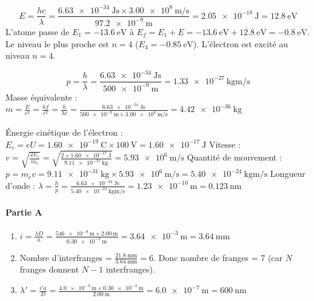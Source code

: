 \[
E = \frac{h c}{\lambda} = \frac{\SI{6.63e-34}{\joule\second} \times \SI{3.00e8}{\metre\per\second}}{\SI{97.2e-9}{\metre}} = \SI{2.05e-18}{\joule} = \SI{12.8}{\electronvolt}
\]
L'atome passe de \(E_1 = \SI{-13.6}{\electronvolt}\) à \(E_f = E_1 + E = \SI{-13.6}{\electronvolt} + \SI{12.8}{\electronvolt} = \SI{-0.8}{\electronvolt}\). Le niveau le plus proche est \(n=4\) (\(E_4 = \SI{-0.85}{\electronvolt}\)). L'électron est excité au niveau \(n=4\).

\[
p = \frac{h}{\lambda} = \frac{\SI{6.63e-34}{\joule\second}}{\SI{500e-9}{\metre}} = \SI{1.33e-27}{\kilogram\metre\per\second}
\]
Masse équivalente : \(m = \frac{E}{c^2} = \frac{h f}{c^2} = \frac{h}{\lambda c} = \frac{\SI{6.63e-34}{\joule\second}}{\SI{500e-9}{\metre} \times \SI{3.00e8}{\metre\per\second}} = \SI{4.42e-36}{\kilogram}\)

Énergie cinétique de l'électron : \(E_c = e U = \SI{1.60e-19}{\coulomb} \times \SI{100}{\volt} = \SI{1.60e-17}{\joule}\)
Vitesse : \(v = \sqrt{\frac{2 E_c}{m_e}} = \sqrt{\frac{2 \times \SI{1.60e-17}{\joule}}{\SI{9.11e-31}{\kilogram}}} = \SI{5.93e6}{\metre\per\second}\)
Quantité de mouvement : \(p = m_e v = \SI{9.11e-31}{\kilogram} \times \SI{5.93e6}{\metre\per\second} = \SI{5.40e-24}{\kilogram\metre\per\second}\)
Longueur d'onde : \(\lambda = \frac{h}{p} = \frac{\SI{6.63e-34}{\joule\second}}{\SI{5.40e-24}{\kilogram\metre\per\second}} = \SI{1.23e-10}{\metre} = \SI{0.123}{\nano\metre}\)

\paragraph{Partie A}
\begin{enumerate}
  \item \(i = \frac{\lambda D}{a} = \frac{\SI{546e-9}{\metre} \times \SI{2.00}{\metre}}{\SI{0.30e-3}{\metre}} = \SI{3.64e-3}{\metre} = \SI{3.64}{\milli\metre}\)
  \item Nombre d'interfranges = \(\frac{\SI{21.8}{\milli\metre}}{\SI{3.64}{\milli\metre}} = 6\). Donc nombre de franges = 7 (car \(N\) franges donnent \(N-1\) interfranges).
  \item \(\lambda' = \frac{i' a}{D} = \frac{\SI{4.0e-3}{\metre} \times \SI{0.30e-3}{\metre}}{\SI{2.00}{\metre}} = \SI{6.0e-7}{\metre} = \SI{600}{\nano\metre}\)
\end{enumerate}

